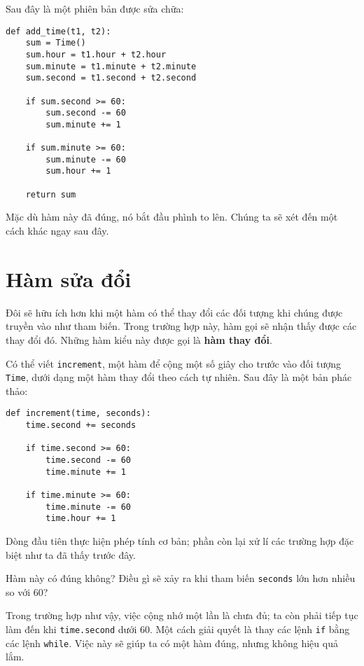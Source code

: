 \documentclass[11pt]{book}
\begin{document}

Sau đây là một phiên bản được sửa chữa:

\beforeverb
\begin{verbatim}
def add_time(t1, t2):
    sum = Time()
    sum.hour = t1.hour + t2.hour
    sum.minute = t1.minute + t2.minute
    sum.second = t1.second + t2.second

    if sum.second >= 60:
        sum.second -= 60
        sum.minute += 1

    if sum.minute >= 60:
        sum.minute -= 60
        sum.hour += 1

    return sum
\end{verbatim}
\afterverb
%
Mặc dù hàm này đã đúng, nó bắt đầu phình to lên. 
Chúng ta sẽ xét đến một cách khác ngay sau đây.


\section{Hàm sửa đổi}
\label{increment}


Đôi sẽ hữu ích hơn khi một hàm có thể thay đổi các đối tượng khi chúng 
được truyền vào như tham biến. Trong trường hợp này, hàm gọi sẽ
nhận thấy được các thay đổi đó. Những hàm kiểu này được gọi là {\bf hàm thay đổi}.


Có thể viết {\tt increment}, một hàm để cộng một số giây cho trước vào
đối tượng {\tt Time}, dưới dạng một hàm thay đổi theo cách tự nhiên.
Sau đây là một bản phác thảo:

\beforeverb
\begin{verbatim}
def increment(time, seconds):
    time.second += seconds

    if time.second >= 60:
        time.second -= 60
        time.minute += 1

    if time.minute >= 60:
        time.minute -= 60
        time.hour += 1
\end{verbatim}
\afterverb
%
Dòng đầu tiên thực hiện phép tính cơ bản; phần còn lại xử lí các
trường hợp đặc biệt như ta đã thấy trước đây.


Hàm này có đúng không? Điều gì sẽ xảy ra khi tham biến {\tt seconds}
lớn hơn nhiều so với 60?

Trong trường hợp như vậy, việc cộng nhớ một lần là chưa đủ;
ta còn phải tiếp tục làm đến khi {\tt time.second} dưới 60.
Một cách giải quyết là thay các lệnh {\tt if} bằng các lệnh {\tt while}.
Việc này sẽ giúp ta có một hàm đúng, nhưng không hiệu quả lắm.
\end{document}

